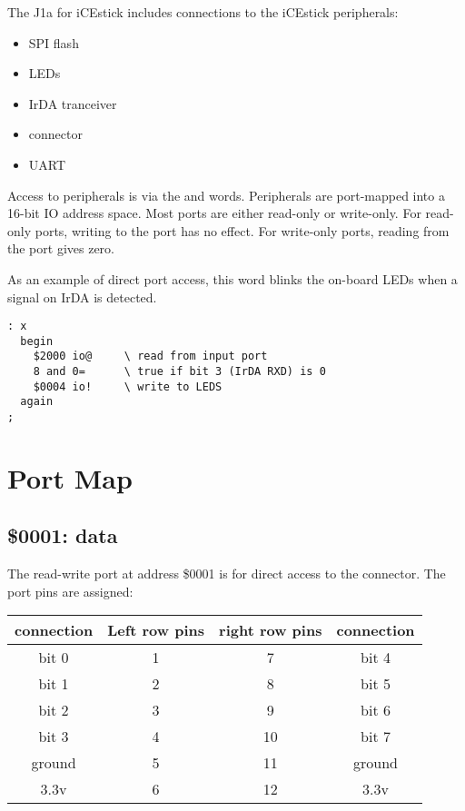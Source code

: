 The J1a for iCEstick includes connections to the iCEstick peripherals:
\begin{itemize}
\item SPI flash 
\item LEDs 
\item IrDA tranceiver 
\item \digilentpmod{} connector 
\item UART 
\end{itemize}

Access to peripherals is via the
 and  words.
Peripherals are port-mapped into a 16-bit IO address space.
Most ports are either read-only or write-only.
For read-only ports, writing to the port has no effect.
For write-only ports, reading from the port gives zero.

As an example of direct port access, this word
blinks the on-board LEDs when a signal on IrDA is detected. 

\begin{framed}
\begin{Verbatim}
: x
  begin
    $2000 io@     \ read from input port
    8 and 0=      \ true if bit 3 (IrDA RXD) is 0
    $0004 io!     \ write to LEDS
  again
;
\end{Verbatim}
\end{framed}

\newpage
\section{Port Map}
\subsection{\$0001: \digilentpmod{} data}

The read-write port at address \$0001 is for direct access to the \digilentpmod{}
connector. The port pins are assigned:

\vspace{10pt}
\begin{tabular}{cccc}
\textbf{connection} & \textbf{Left row pins} & \textbf{right row pins} & \textbf{connection} \\
\hline
bit 0 & 1 &  7 & bit 4 \\
bit 1 & 2 &  8 & bit 5 \\
bit 2 & 3 &  9 & bit 6 \\
bit 3 & 4 & 10 & bit 7 \\
ground & 5 & 11 & ground \\
3.3v & 6 & 12 & 3.3v \\
\end{tabular}
\vspace{10pt}

